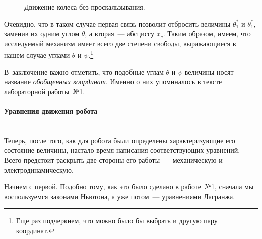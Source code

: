 \documentclass[12pt,a4paper,openany]{extarticle}
\begin{document}
\begin{figure}[h]
	\noindent{}
	\caption{Движение колеса без проскальзывания.}
	\label{wheel}
\end{figure}

Очевидно, что в таком случае первая связь позволит отбросить величины $\theta_1^*$ и $\theta_1^*$, заменив их одним углом $\theta$, а вторая~--- абсциссу $x_c$.
Таким образом, имеем, что исследуемый механизм имеет всего две степени свободы, выражающиеся в нашем случае углами $\theta$ и $\psi$\lefteqn.\footnote{Еще раз подчеркнем, что можно было бы выбрать и другую пару координат.}

В~заключение важно отметить, что подобные углам $\theta$ и $\psi$ величины носят название \textit{обобщенных координат}.
Именно о них упоминалось в тексте лабораторной работы~№1.

\paragraph*{Уравнения движения робота}$\phantom{-}$\\
\hspace*{\parindent}Теперь, после того, как для робота были определены характеризующие его состояние величины, настало время написания соответствующих уравнений.
Всего предстоит раскрыть две стороны его работы~--- механическую и электродинамическую.

Начнем с первой.
Подобно тому, как это было сделано в работе~№1, сначала мы воспользуемся законами Ньютона, а уже потом~--- уравнениями Лагранжа.
\end{document}
